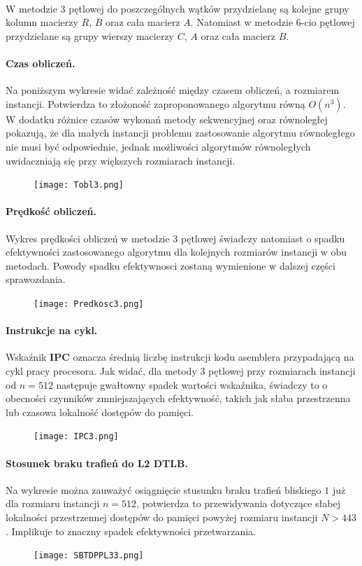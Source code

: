 \documentclass{scrartcl}
\begin{document}
\paragraph{}W metodzie 3 pętlowej do poszczególnych wątków przydzielanę są kolejne grupy kolumn macierzy $R$, $B$ oraz cała macierz $A$. Natomiast w metodzie 6-cio pętlowej przydzielane są grupy wierszy macierzy $C$, $A$ oraz cała macierz $B$.
\paragraph{Czas obliczeń.} Na poniższym wykresie widać zależność między czasem obliczeń, a rozmiarem instancji. Potwierdza to złożoność zaproponowanego algorytmu równą $O(n^{3})$. W dodatku różnice czasów wykonań metody sekwencyjnej oraz równoległej pokazują, że dla małych instancji problemu zastosowanie algorytmu równoległego nie musi być odpowiednie, jednak możliwości algorytmów równoległych uwidaczniają się przy większych rozmiarach instancji.
\begin{figure}[H]
\texttt{[image: Tobl3.png]}\\
\end{figure}
\paragraph{Prędkość obliczeń.} Wykres prędkości obliczeń w metodzie 3 pętlowej świadczy natomiast o spadku efektywności zastosowanego algorytmu dla kolejnych rozmiarów instancji w obu metodach. Powody spadku efektywnosci zostaną wymienione w dalszej części sprawozdania.
\begin{figure}[H]
\texttt{[image: Predkosc3.png]}\\
\end{figure}
\newpage
\paragraph{Instrukcje na cykl.} Wskaźnik \textbf{IPC} oznacza średnią liczbę instrukcji kodu asemblera przypadającą na cykl pracy procesora. Jak widać, dla metody 3 pętlowej przy rozmiarach instancji od $n = 512$ następuje gwałtowny spadek wartości wskaźnika, świadczy to o obecności czynników zmniejszających efektywność, takich jak słaba przestrzenna lub czasowa lokalność dostępów do pamięci.
\begin{figure}[H]
\texttt{[image: IPC3.png]}\\
\end{figure}
\newpage
\paragraph{Stosunek braku trafień do L2 DTLB.} Na wykresie można zauważyć osiągnięcie stusunku braku trafień bliskiego $1$ już dla rozmiaru instancji $n = 512$, potwierdza to przewidywania dotyczące słabej lokalności przestrzennej dostępów do pamięci powyżej rozmiaru instancji $N > 443$. Implikuje to znaczny spadek efektywności przetwarzania.
\begin{figure}[H]
\texttt{[image: SBTDPPL33.png]}\\
\end{figure}
\newpage
\end{document}
